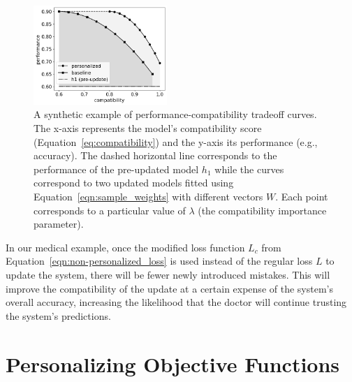 \documentclass[letterpaper]{article} %
\theoremstyle{definition}
\newtheorem{definition}{Definition}
\newcommand{\kibitz}[2]{\ifnum\Comments=1{\color{#1}{#2}}\fi}
\newcommand{\ym}[1]{\kibitz{blue}{[YM:#1]}}
\newcommand{\kg}[1]{\kibitz{red}{[KG:#1]}}
\begin{document}
\begin{figure}[t]
     \centering
     \includegraphics[width=0.45\textwidth]{example_tradeoff}
     \caption{A synthetic example of performance-compatibility tradeoff curves. The x-axis represents the model's compatibility score (Equation~\ref{eq:compatibility}) and the y-axis its performance (e.g., accuracy). The dashed horizontal line corresponds to the performance of the pre-updated model $h_1$ while the curves correspond to two updated models fitted using Equation~\ref{eqn:sample_weights} with different vectors $W$. Each point corresponds to a particular value of $\lambda$ (the compatibility importance parameter).
     }
    \label{fig:example_tradeoff}
\end{figure}
%
%
%
In our medical example, once the modified loss function $L_c$ from Equation~\ref{eqn:non-personalized_loss} is used instead of the regular loss $L$ to update the system, there will be fewer newly introduced mistakes. This will improve the compatibility of the update at a certain expense of the system's overall accuracy, increasing the likelihood that the doctor will continue trusting the system's predictions.
%
\section{Personalizing Objective Functions}
\label{sec:personalization}
\end{document}

